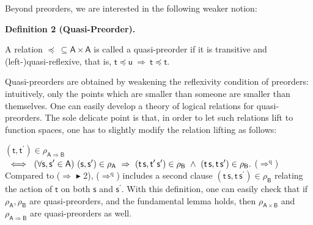  
 
Beyond preorders, we are interested in the following weaker notion:\par
 
 
 
\par\medskip\noindent\textbf{Definition 2 (Quasi-Preorder).}\par
 
 
A relation $\preceq\ \subseteq\mathsf{A}\times\mathsf{A}$ is called a quasi-preorder if it is transitive and (left-)quasi-reflexive, that is, $\mathsf{t}\preceq\mathsf{u}\ \Rightarrow\ \mathsf{t}\preceq\mathsf{t}$.\par
 
 
 
 
Quasi-preorders are obtained by weakening the reflexivity condition of preorders: intuitively, only the points which are smaller than someone are smaller than themselves. One can easily develop a theory of logical relations for quasi-preorders. The sole delicate point is that, in order to let such relations lift to function spaces, one has to slightly modify the relation lifting as follows:\par
    $\displaystyle(\mathsf{t},\mathsf{t}^{\prime})\in\rho_{\mathsf{A}\Rightarrow%
\mathsf{B}}$ $\displaystyle\ \iff\ (\forall\mathsf{s},\mathsf{s}^{\prime}\in\mathsf{A})\ (%
\mathsf{s},\mathsf{s}^{\prime})\in\rho_{\mathsf{A}}\ \Rightarrow\ (\mathsf{t}%
\,\mathsf{s},\mathsf{t^{\prime}}\,\mathsf{s^{\prime}})\in\rho_{\mathsf{B}}\ %
\land\ (\mathsf{t}\,\mathsf{s},\mathsf{t}\,\mathsf{s}^{\prime})\in\rho_{%
\mathsf{B}}.$  ($\Rightarrow^{\mathrm{q}}$)   
Compared to ($\Rightarrow$ \ensuremath{\blacktriangleright} 2), ($\Rightarrow^{\mathrm{q}}$) includes a second clause $(\mathsf{t}\,\mathsf{s},\mathsf{t}\,\mathsf{s}^{\prime})\in\rho_{\mathsf{B}}$ relating the action of $\mathsf{t}$ on both $\mathsf{s}$ and $\mathsf{s}^{\prime}$. With this definition, one can easily check that if $\rho_{\mathsf{A}},\rho_{\mathsf{B}}$ are quasi-preorders, and the fundamental lemma holds, then $\rho_{\mathsf{A}\times\mathsf{B}}$ and $\rho_{\mathsf{A}\Rightarrow\mathsf{B}}$ are quasi-preorders as well.\par
 
